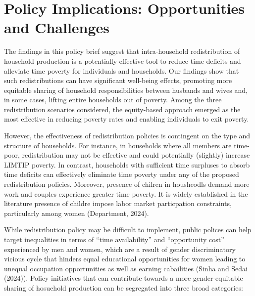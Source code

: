 \documentclass[
  11pt,
]{article}
\begin{document}
\section{Policy Implications: Opportunities and
Challenges}\label{policy-implications-opportunities-and-challenges}

The findings in this policy brief suggest that intra-household
redistribution of household production is a potentially effective tool
to reduce time deficits and alleviate time poverty for individuals and
households. Our findings show that such redistributions can have
significant well-being effects, promoting more equitable sharing of
household responsibilities between husbands and wives and, in some
cases, lifting entire households out of poverty. Among the three
redistribution scenarios considered, the equity-based approach emerged
as the most effective in reducing poverty rates and enabling individuals
to exit poverty.

However, the effectiveness of redistribution policies is contingent on
the type and structure of households. For instance, in households where
all members are time-poor, redistribution may not be effective and could
potentially (slightly) increase LIMTIP poverty. In contrast, households
with sufficient time surpluses to absorb time deficits can effectively
eliminate time poverty under any of the proposed redistribution
policies. Moreover, presence of chilren in housheodls demand more work
and couples experience greater time poverty. It is widely established in
the literature presence of childre impose labor market particpation
constraints, particularly among women (Department, 2024).

While redistribution policy may be difficult to implement, public
polices can help target inequalities in terms of ``time availability''
and ``opportunity cost'' experienced by men and women, which are a
result of gender discriminatory vicious cycle that hinders equal
educational opportunities for women leading to unequal occupation
opportunities as well as earning cabailities (Sinha and Sedai (2024)).
Policy initiatives that can contribute towards a more gender-equitable
sharing of hosuehold production can be segregated into three broad
categories:
\end{document}
